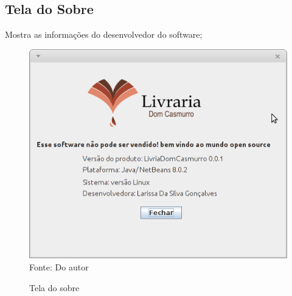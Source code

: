 \subsection{Tela do Sobre}

Mostra as informações do desenvolvedor do software;

\begin{figure}[H]
	\centering 
	\caption{Tela do sobre}
	\label{sobre}
	\includegraphics[scale = 0.6]{imagens/tela-sobre.png}
	\\Fonte: Do autor
\end{figure}







